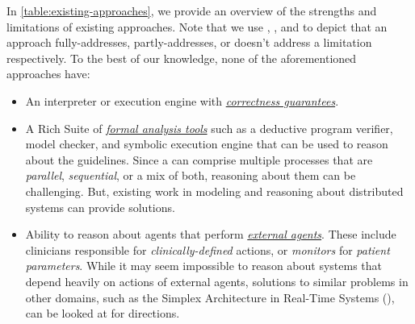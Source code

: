 In \tablename{} \ref{table:existing-approaches}, we provide an overview of
the strengths and limitations of existing approaches. Note that we use
\greencheck{}, \cancelcheck{}, and \redcross{} to depict that an approach
fully-addresses, partly-addresses, or doesn't address a limitation respectively.
To the best of our knowledge,
none of the aforementioned approaches have:
\begin{itemize}[leftmargin=*]
  \setlength\itemsep{0em}
  \item An interpreter or execution engine with \emph{\underline{correctness guarantees}}.
  \item A Rich Suite of \emph{\underline{formal analysis tools}} such as a deductive program
    verifier, model checker, and symbolic execution engine that can be used to
    reason about the guidelines. Since a \CIG{} can comprise multiple
    processes that are \emph{parallel}, \emph{sequential}, or a mix of both,
    reasoning about them can be challenging. But, existing work in modeling
    and reasoning about distributed systems can provide solutions.
  \item Ability to reason about agents that perform \emph{\underline{external
    agents}}. These include clinicians responsible for \emph{clinically-defined}
    actions, or \emph{monitors} for \emph{patient parameters}. While it may seem
    impossible to reason about systems that depend heavily on actions of
    external agents, solutions to similar problems in other domains, such as
    the Simplex Architecture \cite{BakRTAS09} in Real-Time Systems (\RTSs), can be looked at for directions.
\end{itemize}

